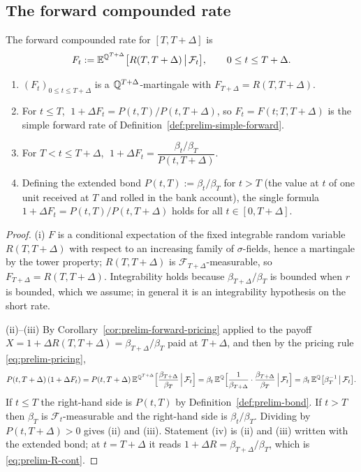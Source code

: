 \documentclass[../../../main.tex]{subfiles}
\begin{document}
\subsection{The forward compounded rate}

\begin{definition}\label{def:prelim-F}
The forward compounded rate for $[T,T+\Delta]$ is
\[
F_t:=\mathbb{E}^{\mathbb{Q}^{T+\Delta}}\big[R(T,T+\Delta)\,\big|\,\mathcal F_t\big],\qquad 0\le t\le T+\Delta .
\]
\end{definition}

\begin{proposition}\label{prop:prelim-F-bond}
\begin{enumerate}[nosep,label=(\roman*)]
\item $(F_t)_{0\le t\le T+\Delta}$ is a $\mathbb{Q}^{T+\Delta}$-martingale with $F_{T+\Delta}=R(T,T+\Delta)$.
\item For $t\le T$, $\;1+\Delta F_t=P(t,T)/P(t,T+\Delta)$, so $F_t=F(t;T,T+\Delta)$ is the simple forward rate of Definition~\ref{def:prelim-simple-forward}.
\item For $T<t\le T+\Delta$, $\;1+\Delta F_t=\dfrac{\beta_t/\beta_T}{P(t,T+\Delta)}$.
\item Defining the extended bond $P(t,T):=\beta_t/\beta_T$ for $t>T$ (the value at $t$ of one unit received at $T$ and rolled in the bank account), the single formula $1+\Delta F_t=P(t,T)/P(t,T+\Delta)$ holds for all $t\in[0,T+\Delta]$.
\end{enumerate}
\end{proposition}

\begin{proof}
(i) $F$ is a conditional expectation of the fixed integrable random variable $R(T,T+\Delta)$ with respect to an increasing family of $\sigma$-fields, hence a martingale by the tower property; $R(T,T+\Delta)$ is $\mathcal F_{T+\Delta}$-measurable, so $F_{T+\Delta}=R(T,T+\Delta)$. Integrability holds because $\beta_{T+\Delta}/\beta_T$ is bounded when $r$ is bounded, which we assume; in general it is an integrability hypothesis on the short rate.

(ii)--(iii) By Corollary~\ref{cor:prelim-forward-pricing} applied to the payoff $X=1+\Delta R(T,T+\Delta)=\beta_{T+\Delta}/\beta_T$ paid at $T+\Delta$, and then by the pricing rule \eqref{eq:prelim-pricing},
\[
P(t,T+\Delta)\,(1+\Delta F_t)=P(t,T+\Delta)\,\mathbb{E}^{\mathbb{Q}^{T+\Delta}}\Big[\frac{\beta_{T+\Delta}}{\beta_T}\,\Big|\,\mathcal F_t\Big]
=\beta_t\,\mathbb{E}^{\mathbb{Q}}\Big[\frac{1}{\beta_{T+\Delta}}\cdot\frac{\beta_{T+\Delta}}{\beta_T}\,\Big|\,\mathcal F_t\Big]
=\beta_t\,\mathbb{E}^{\mathbb{Q}}\big[\beta_T^{-1}\,\big|\,\mathcal F_t\big].
\]
If $t\le T$ the right-hand side is $P(t,T)$ by Definition~\ref{def:prelim-bond}. If $t>T$ then $\beta_T$ is $\mathcal F_t$-measurable and the right-hand side is $\beta_t/\beta_T$. Dividing by $P(t,T+\Delta)>0$ gives (ii) and (iii). Statement (iv) is (ii) and (iii) written with the extended bond; at $t=T+\Delta$ it reads $1+\Delta R=\beta_{T+\Delta}/\beta_T$, which is \eqref{eq:prelim-R-cont}.
\end{proof}
\end{document}
